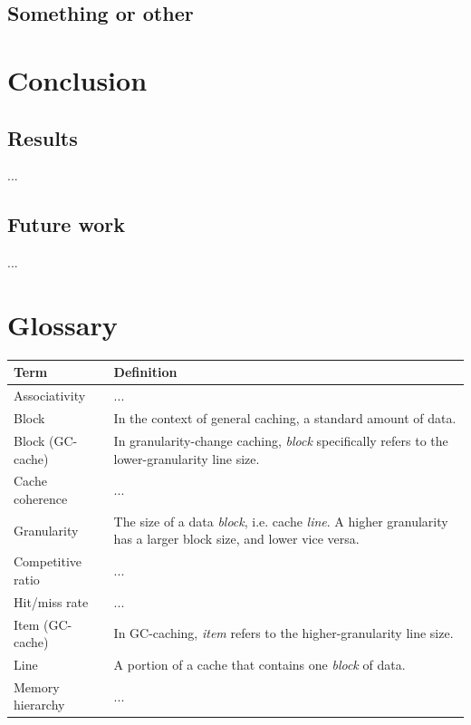 \documentclass[12pt,twoside]{reedthesis}
\begin{document}
\section{Something or other}

\chapter{Conclusion}

\section{Results}

...

\section{Future work}

...

\appendix
\chapter{Glossary}

\def\arraystretch{1.5}
\begin{tabular}{p{1.5in}p{3.8in}}
    \hline
    \textbf{Term}       & \textbf{Definition} \\
    \hline
	Associativity		& ... \\
	Block               & In the context of general caching, a standard amount of data. \\
	Block (GC-cache)	& In granularity-change caching, \textit{block} specifically refers to the lower-granularity line size. \\
	Cache coherence		& ... \\
	Granularity         & The size of a data \textit{block}, i.e. cache \textit{line}. A higher granularity has a larger block size, and lower vice versa. \\
	Competitive ratio	& ... \\
	Hit/miss rate 		& ... \\
    Item (GC-cache)  	& In GC-caching, \textit{item} refers to the higher-granularity line size. \\
    Line                & A portion of a cache that contains one \textit{block} of data. \\
	Memory hierarchy	& ... \\
\end{tabular}
\end{document}
